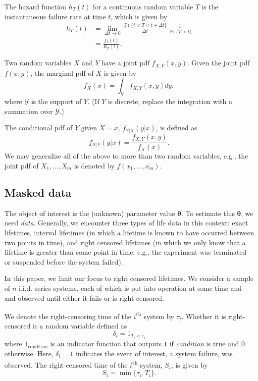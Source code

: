 \documentclass[
]{article}
\begin{document}
\begin{definition}
\label{def:failure_rate}
The hazard function $h_T(t)$ for a continuous random variable $T$ is the
instantaneous failure rate at time $t$, which is given by
\begin{equation}
\label{eq:failure_rate}
\begin{split}
h_T(t) &= \lim_{\Delta t \to 0} \frac{\Pr\{t < T < t+\Delta t\}}{\Delta t} \frac{1}{\Pr\{T > t\}}\\
       &= \frac{f_T(t)}{R_T(t)}.
\end{split}
\end{equation}
\end{definition}

Two random variables \(X\) and \(Y\) have a joint pdf \(f_{X,Y}(x,y)\).
Given the joint pdf \(f(x,y)\), the marginal pdf of \(X\) is given by \[
f_X(x) = \int_{\mathcal{Y}} f_{X,Y}(x,y) dy,
\] where \(\mathcal{Y}\) is the support of \(Y\). (If \(Y\) is discrete,
replace the integration with a summation over \(\mathcal{Y}\).)

The conditional pdf of \(Y\) given \(X=x\), \(f_{Y|X}(y|x)\), is defined
as \[
f_{X|Y}(y|x) = \frac{f_{X,Y}(x,y)}{f_X(x)}.
\] We may generalize all of the above to more than two random variables,
e.g., the joint pdf of \(X_1,\ldots,X_m\) is denoted by
\(f(x_1,\ldots,x_m)\).

\hypertarget{sec:data}{%
\subsection{Masked data}\label{sec:data}}

The object of interest is the (unknown) parameter value
\(\boldsymbol{\theta}\). To estimate this \(\boldsymbol{\theta}\), we
need \emph{data}. Generally, we encounter three types of life data in
this context: exact lifetimes, interval lifetimes (in which a lifetime
is known to have occurred between two points in time), and right
censored lifetimes (in which we only know that a lifetime is greater
than some point in time, e.g., the experiment was terminated or
suspended before the system failed).

In this paper, we limit our focus to right censored lifetimes. We
consider a sample of \(n\) i.i.d. series systems, each of which is put
into operation at some time and and observed until either it fails or is
right-censored.

We denote the right-censoring time of the \(i\)\textsuperscript{th}
system by \(\tau_i\). Whether it is right-censored is a random variable
defined as \begin{equation}
    \delta_i = 1_{T_i < \tau_i}
\end{equation} where \(1_{\text{condition}}\) is an indicator function
that outputs \(1\) if \emph{condition} is true and \(0\) otherwise.
Here, \(\delta_i = 1\) indicates the event of interest, a system
failure, was observed. The right-censored time of the
\(i\)\textsuperscript{th} system, \(S_i\), is given by \begin{equation}
    S_i = \min\{\tau_i, T_i\}.
\end{equation}
\end{document}
